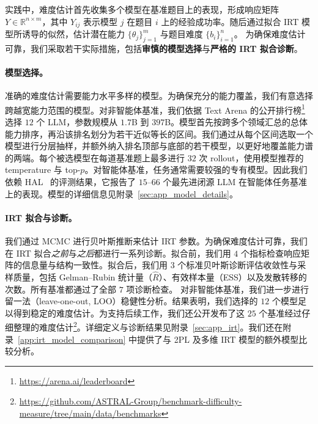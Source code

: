 实践中，难度估计首先收集多个模型在基准题目上的表现，形成响应矩阵 $Y \in \mathbb{R}^{n \times m}$，其中 $Y_{ij}$ 表示模型 $j$ 在题目 $i$ 上的经验成功率。随后通过拟合 IRT 模型所诱导的似然，估计潜在能力 $\{\theta_j\}_{j=1}^m$ 与题目难度 $\{b_i\}_{i=1}^n$。
为确保难度估计可靠，我们采取若干实际措施，包括\textbf{审慎的模型选择}与\textbf{严格的 IRT 拟合诊断}。

\paragraph{模型选择。}
准确的难度估计需要能力水平多样的模型。为确保充分的能力覆盖，我们有意选择跨越宽能力范围的模型。对非智能体基准，我们依据 Text Arena 的公开排行榜\footnote{\url{https://arena.ai/leaderboard}} 选择 $12$ 个 LLM，参数规模从 $1.7$B 到 $397$B。模型首先按跨多个领域汇总的总体能力排序，再沿该排名划分为若干近似等长的区间。我们通过从每个区间选取一个模型进行分层抽样，并额外纳入排名顶部与底部的若干模型，以更好地覆盖能力谱的两端。每个被选模型在每道基准题上最多进行 $32$ 次 rollout，使用模型推荐的 temperature 与 top-$p$。对智能体基准，任务通常需要较强的专有模型。因此我们依赖 HAL~\cite{hal} 的评测结果，它报告了 $15$--$66$ 个最先进闭源 LLM 在智能体任务基准上的表现。模型的详细信息见附录~\ref{sec:app_model_details}。

\paragraph{IRT 拟合与诊断。}
我们通过 MCMC 进行贝叶斯推断来估计 IRT 参数。为确保难度估计可靠，我们在 IRT 拟合\textit{之前}与\textit{之后}都进行一系列诊断。拟合前，我们用 $4$ 个指标检查响应矩阵的信息量与结构一致性。拟合后，我们用 $3$ 个标准贝叶斯诊断评估收敛性与采样质量，包括 Gelman--Rubin 统计量（$\hat{R}$）、有效样本量（ESS）以及发散转移的次数。所有基准都通过了全部 $7$ 项诊断检查。
对非智能体基准，我们进一步进行留一法（leave-one-out, LOO）稳健性分析。结果表明，我们选择的 $12$ 个模型足以得到稳定的难度估计。为支持后续工作，我们还公开发布了这 $25$ 个基准经过仔细整理的难度估计\footnote{\url{https://github.com/ASTRAL-Group/benchmark-difficulty-measure/tree/main/data/benchmarks}}。详细定义与诊断结果见附录~\ref{sec:app_irt}。我们还在附录~\ref{app:irt_model_comparison} 中提供了与 2PL 及多维 IRT 模型的额外模型比较分析。


